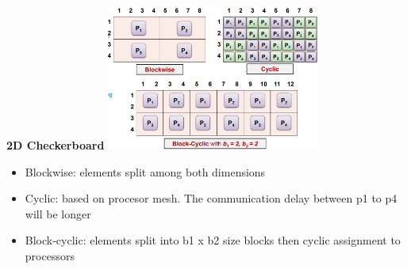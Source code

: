 \documentclass[10pt, landscape]{article}
\begin{document}
\begin{multicols}{4}
\textbf{2D Checkerboard}
\includegraphics*[width=7cm]{checkerboard.png}
\begin{itemize}
    \item Blockwise: elements split among both dimensions 
    \item Cyclic: based on procesor mesh. The communication delay between p1 to p4 will be longer
    \item Block-cyclic: elements split into b1 x b2 size blocks then cyclic assignment to processors
\end{itemize}
 

\end{multicols}
\end{document}
